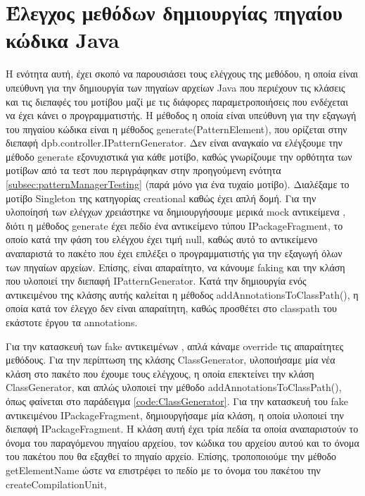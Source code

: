 \section{Έλεγχος μεθόδων δημιουργίας πηγαίου κώδικα Java}
\label{sec:patternGeneratorTesting}
Η ενότητα αυτή, έχει σκοπό να παρουσιάσει τους ελέγχους της μεθόδου, η οποία είναι υπεύθυνη 
για την δημιουργία των πηγαίων αρχείων Java που περιέχουν τις κλάσεις και τις διεπαφές του μοτίβου μαζί με τις 
διάφορες παραμετροποιήσεις που ενδέχεται να έχει κάνει ο προγραμματιστής. Η μέθοδος η οποία είναι υπεύθυνη για την εξαγωγή 
του πηγαίου κώδικα είναι η μέθοδος generate(PatternElement), που ορίζεται στην διεπαφή dpb.controller.IPatternGenerator. 
Δεν είναι αναγκαίο να ελέγξουμε την μέθοδο generate εξονυχιστικά για κάθε μοτίβο, καθώς γνωρίζουμε την ορθότητα των μοτίβων από τα τεστ που 
περιγράφηκαν στην προηγούμενη ενότητα \ref{subsec:patternManagerTesting} (παρά μόνο για ένα τυχαίο μοτίβο). 
Διαλέξαμε το μοτίβο Singleton \cite{GoF} της κατηγορίας creational καθώς έχει απλή δομή. Για την υλοποίησή των ελέγχων χρειάστηκε να δημιουργήσουμε
μερικά mock αντικείμενα \cite{SWEBOK}, διότι η μέθοδος generate έχει πεδίο ένα αντικείμενο τύπου IPackageFragment, 
το οποίο κατά την φάση του ελέγχου έχει τιμή null, καθώς αυτό το αντικείμενο αναπαριστά το πακέτο που έχει επιλέξει ο προγραμματιστής 
για την εξαγωγή όλων των πηγαίων αρχείων. Επίσης, είναι απαραίτητο, να κάνουμε faking \cite{SWEBOK} και την κλάση που υλοποιεί
την διεπαφή IPatternGenerator. Κατά την δημιουργία ενός αντικειμένου της κλάσης αυτής καλείται 
η μέθοδος addAnnotationsToClassPath(), η οποία κατά τον έλεγχο δεν είναι απαραίτητη, καθώς προσθέτει στο classpath του εκάστοτε έργου 
τα annotations.\par Για την κατασκευή των fake αντικειμένων \cite{SWEBOK}, απλά κάναμε override τις απαραίτητες μεθόδους.
Για την περίπτωση της κλάσης ClassGenerator, υλοποιήσαμε μία νέα κλάση στο πακέτο που έχουμε τους ελέγχους, 
η οποία επεκτείνει την κλάση ClassGenerator, και απλώς υλοποιεί την μέθοδο addAnnotationsToClassPath(), όπως φαίνεται στο παράδειγμα 
\ref{code:ClassGenerator}. Για την κατασκευή του fake αντικειμένου \cite{SWEBOK} IPackageFragment, 
δημιουργήσαμε μία κλάση, η οποία υλοποιεί την διεπαφή \mbox{IPackageFragment}. Η κλάση αυτή έχει τρία πεδία τα οποία αναπαριστούν 
το όνομα του παραγόμενου πηγαίου αρχείου, τον κώδικα του αρχείου αυτού και το όνομα του πακέτου που θα εξαχθεί το πηγαίο αρχείο. 
Επίσης, τροποποιούμε την μέθοδο getElementName ώστε να επιστρέφει το πεδίο με το όνομα του πακέτου την createCompilationUnit, 
